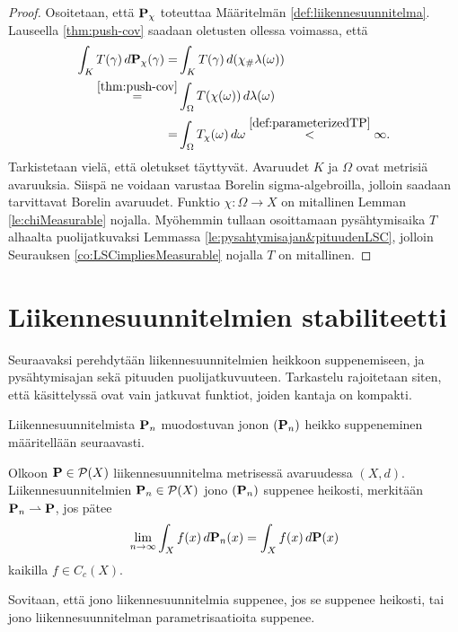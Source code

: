 \documentclass[12pt,oneside,a4paper]{amsbook} %
\begin{document}
\begin{proof}
Osoitetaan, että $\P_\chi$ toteuttaa Määritelmän \ref{def:liikennesuunnitelma}. Lauseella \ref{thm:push-cov} saadaan oletusten ollessa voimassa, että
\begin{align*}
    \int_K T(\gamma)\, d\P_\chi(\gamma) =& \int_K T(\gamma) \, d(\chi_\# \lambda(\omega)) \\
    \stackrel{\ref{thm:push-cov}}{=}& \int_\Omega T(\chi(\omega)) \, d\lambda(\omega) \\
    =& \int_\Omega T_\chi(\omega) \, d\omega \stackrel{\ref{def:parameterizedTP}}{<} \infty.
\end{align*}
Tarkistetaan vielä, että oletukset täyttyvät. Avaruudet $K$ ja $\Omega$ ovat metrisiä avaruuksia. Siispä ne voidaan varustaa Borelin sigma-algebroilla, jolloin saadaan tarvittavat Borelin avaruudet. Funktio $\chi:\Omega \to X$ on mitallinen Lemman \ref{le:chiMeasurable} nojalla. Myöhemmin tullaan osoittamaan pysähtymisaika $T$ alhaalta puolijatkuvaksi Lemmassa \ref{le:pysahtymisajan&pituudenLSC}, jolloin Seurauksen \ref{co:LSCimpliesMeasurable} nojalla $T$ on mitallinen. 
\end{proof}



\section{Liikennesuunnitelmien {stabiliteetti}}
Seuraavaksi perehdytään liikennesuunnitelmien heikkoon suppenemiseen, ja pysähtymisajan sekä pituuden puolijatkuvuuteen. Tarkastelu rajoitetaan siten, että käsittelyssä ovat vain jatkuvat funktiot, joiden kantaja on kompakti.

Liikennesuunnitelmista $\P_n$ muodostuvan jonon $(\P_n)$ heikko suppeneminen määritellään seuraavasti.

\begin{definition} \label{def:weakConv}
    Olkoon $\P \in \mathcal{P}(X)$ liikennesuunnitelma metrisessä avaruudessa $(X, d)$. Liikennesuunnitelmien $\P_n \in \mathcal{P}(X)$ jono $(\P_n)$ suppenee heikosti, merkitään $\P_n \rightharpoonup \P$, jos pätee 
    \begin{equation*}
        \lim_{n\to\infty} \int_X f(x) \, d\P_n (x) = \int_X f(x) \, d\P(x)
    \end{equation*}
    kaikilla $f \in C_c(X)$.
\end{definition}

Sovitaan, että jono liikennesuunnitelmia suppenee, jos se suppenee heikosti, tai jono liikennesuunnitelman parametrisaatioita suppenee.
\end{document}

